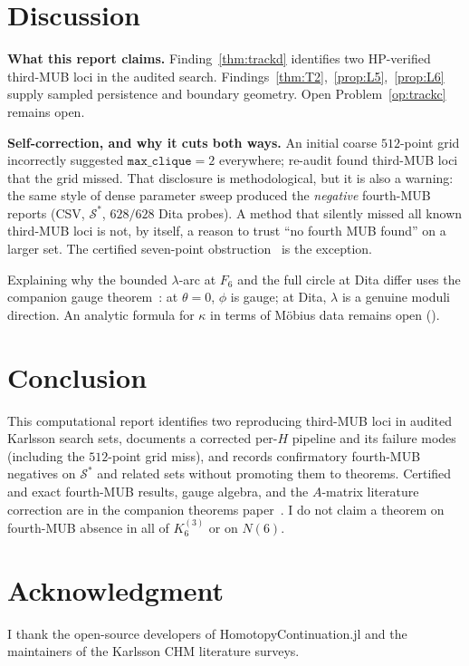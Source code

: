 \documentclass[onecolumn]{IEEEtran}
\begin{document}
\section{Discussion}
\label{sec:discussion}

\textbf{What this report claims.} Finding~\ref{thm:trackd} identifies two HP-verified third-MUB loci in the audited search. Findings~\ref{thm:T2},~\ref{prop:L5},~\ref{prop:L6} supply sampled persistence and boundary geometry. Open Problem~\ref{op:trackc} remains open.

\textbf{Self-correction, and why it cuts both ways.} An initial coarse $512$-point grid incorrectly suggested $\texttt{max\_clique}=2$ everywhere; re-audit found third-MUB loci that the grid missed.
That disclosure is methodological, but it is also a warning: the same style of dense parameter sweep produced the \emph{negative} fourth-MUB reports (CSV, $\mathcal{S}^*$, $628/628$ Dita probes). A method that silently missed all known third-MUB loci is not, by itself, a reason to trust ``no fourth MUB found'' on a larger set. The certified seven-point obstruction~\cite{JaupiTheorems2026} is the exception.

Explaining why the bounded $\lambda$-arc at $F_6$ and the full circle at Dita differ uses the companion gauge theorem~\cite{JaupiTheorems2026}: at $\theta=0$, $\phi$ is gauge; at Dita, $\lambda$ is a genuine moduli direction. An analytic formula for $\kappa$ in terms of M\"obius data remains open ().

\section{Conclusion}
\label{sec:conclusion}

This computational report identifies two reproducing third-MUB loci in audited Karlsson search sets, documents a corrected per-$H$ pipeline and its failure modes (including the $512$-point grid miss), and records confirmatory fourth-MUB negatives on $\mathcal{S}^*$ and related sets without promoting them to theorems.
Certified and exact fourth-MUB results, gauge algebra, and the $A$-matrix literature correction are in the companion theorems paper~\cite{JaupiTheorems2026}.
I do not claim a theorem on fourth-MUB absence in all of $K_6^{(3)}$ or on $N(6)$.

\section*{Acknowledgment}
I thank the open-source developers of HomotopyContinuation.jl and the maintainers of the Karlsson CHM literature surveys.
\end{document}

